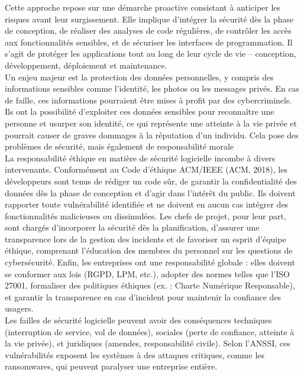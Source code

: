 \documentclass{article}
\begin{document}
Cette approche repose sur une démarche proactive consistant à anticiper les risques avant leur
surgissement. Elle implique d'intégrer la sécurité dès la phase de conception, de réaliser des
analyses de code régulières, de contrôler les accès aux fonctionnalités sensibles, et de sécuriser
les interfaces de programmation. Il s’agit de protéger les applications tout au long de leur cycle
de vie – conception, développement, déploiement et maintenance.\\

Un enjeu majeur est la protection des données personnelles, y compris des informations
sensibles comme l’identité, les photos ou les messages privés. En cas de faille, ces informations
pourraient être mises à profit par des cybercriminels. Ils ont la possibilité d'exploiter ces
données sensibles pour reconnaître une personne et usurper son identité, ce qui représente une
atteinte à la vie privée et pourrait causer de graves dommages à la réputation d'un individu.
Cela pose des problèmes de sécurité, mais également de responsabilité morale\\



La responsabilité éthique en matière de sécurité logicielle incombe à divers intervenants.
Conformément au Code d'éthique ACM/IEEE (ACM, 2018), les développeurs sont tenus de
rédiger un code sûr, de garantir la confidentialité des données dès la phase de conception et
d'agir dans l'intérêt du public. Ils doivent rapporter toute vulnérabilité identifiée et ne doivent
en aucun cas intégrer des fonctionnalités malicieuses ou dissimulées. Les chefs de projet, pour
leur part, sont chargés d’incorporer la sécurité dès la planification, d’assurer une transparence
lors de la gestion des incidents et de favoriser un esprit d'équipe éthique, comprenant
l'éducation des membres du personnel sur les questions de cybersécurité. Enfin, les entreprises
ont une responsabilité globale : elles doivent se conformer aux lois (RGPD, LPM, etc.), adopter
des normes telles que l’ISO 27001, formaliser des politiques éthiques (ex. : Charte Numérique
Responsable), et garantir la transparence en cas d’incident pour maintenir la confiance des
usagers.\\

Les failles de sécurité logicielle peuvent avoir des conséquences techniques (interruption
de service, vol de données), sociales (perte de confiance, atteinte à la vie privée), et juridiques
(amendes, responsabilité civile). Selon l’ANSSI, ces vulnérabilités exposent les systèmes à des
attaques critiques, comme les ransomwares, qui peuvent paralyser une entreprise entière.\\
\end{document}
